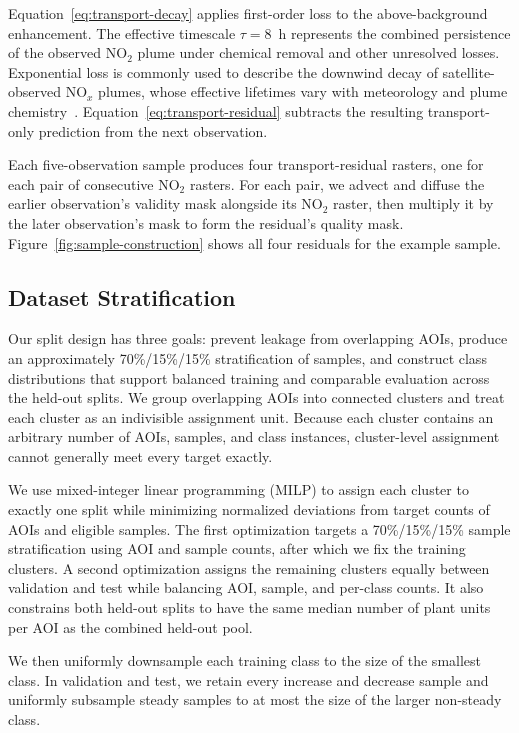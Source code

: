 \documentclass[sigconf,nonacm]{acmart}
\newcommand{\NOx}{NO$_x$}
\begin{document}
Equation~\eqref{eq:transport-decay} applies first-order loss to the
above-background enhancement. The effective timescale $\tau=8$~h represents
the combined persistence of the observed NO$_2$ plume under chemical removal
and other unresolved losses. Exponential loss is commonly used to describe the downwind decay of
satellite-observed \NOx{} plumes, whose effective lifetimes vary with
meteorology and plume chemistry~\cite{meier2024conversion}.
Equation~\eqref{eq:transport-residual} subtracts the resulting transport-only
prediction from the next observation.

Each five-observation sample produces four transport-residual rasters, one for
each pair of consecutive NO$_2$ rasters. For each pair, we advect and diffuse
the earlier observation's validity mask alongside its NO$_2$ raster, then
multiply it by the later observation's mask to form the residual's quality mask.
Figure~\ref{fig:sample-construction} shows all four residuals for the example
sample.

\subsection{Dataset Stratification}

Our split design has three goals: prevent leakage from overlapping AOIs,
produce an approximately 70\%/15\%/15\% stratification of samples, and construct class distributions that
support balanced training and comparable evaluation across the held-out
splits. We group overlapping AOIs into connected clusters and treat each
cluster as an indivisible assignment unit. Because each cluster contains an
arbitrary number of AOIs, samples, and class instances, cluster-level
assignment cannot generally meet every target exactly.

We use mixed-integer linear programming (MILP) to assign each
cluster to exactly one split while minimizing normalized deviations from
target counts of AOIs and eligible samples. The first optimization targets a
70\%/15\%/15\% sample stratification using AOI and sample counts,
after which we fix the training clusters. A second optimization assigns the
remaining clusters equally between validation and test while balancing AOI,
sample, and per-class counts. It also constrains both held-out splits to have
the same median number of plant units per AOI as the combined held-out pool.

We then uniformly downsample each training class to the size of the smallest
class. In validation and test, we retain every increase and decrease sample and
uniformly subsample steady samples to at most the size of the larger non-steady
class.
\end{document}
